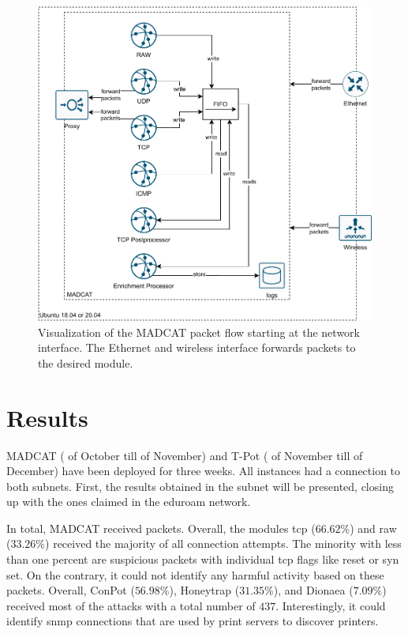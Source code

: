 \begin{figure}[htbp]
    \centering
    \includegraphics[width=\textwidth]{figures/heicat-architecture.pdf}
    \caption[Visualization of the MADCAT packet flow]{
        Visualization of the MADCAT packet flow starting at the network interface.
        The Ethernet and wireless interface forwards packets to the desired module.
    }
    \label{fig:madcat-architecture}
\end{figure}

\section{Results}

MADCAT ( of October till  of November) and T-Pot ( of November till  of December) have been deployed for three weeks.
All instances had a connection to both subnets.
First, the results obtained in the subnet  will be presented, closing up with the ones claimed in the eduroam network.

In total, MADCAT received  packets.
Overall, the modules \ac{tcp} ($66.62\%$) and raw ($33.26\%$) received the majority of all connection attempts.
The minority with less than one percent are suspicious packets with individual \ac{tcp} flags like reset or syn set. 
On the contrary, it could not identify any harmful activity based on these packets.
Overall, ConPot ($56.98\%$), Honeytrap ($31.35\%$), and Dionaea ($7.09\%$) received most of the attacks with a total number of $437$.
Interestingly, it could identify \ac{snmp} connections that are used by print servers to discover printers.

